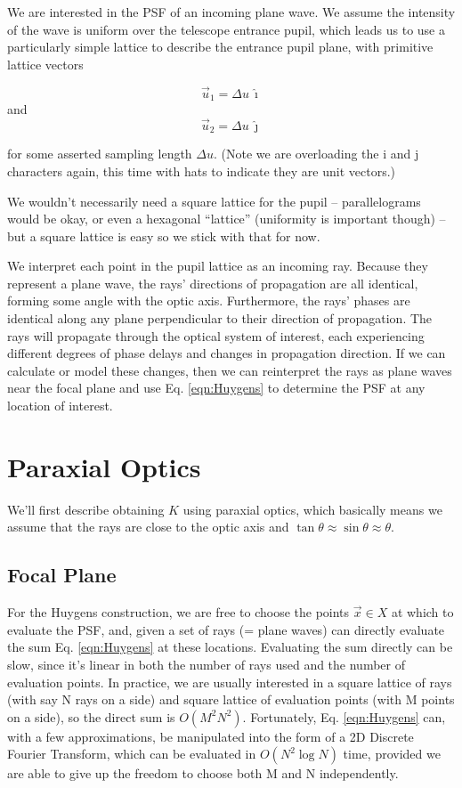\documentclass{article}
\begin{document}
We are interested in the PSF of an incoming plane wave.  We assume the intensity of the wave is
uniform over the telescope entrance pupil, which leads us to use a particularly simple lattice to
describe the entrance pupil plane, with primitive lattice vectors

\begin{equation}
    \vec{u}_1 = \Delta u \, \hat{\imath}
\end{equation}
and
\begin{equation}
    \vec{u}_2 = \Delta u \, \hat{\jmath}
\end{equation}

for some asserted sampling length $\Delta u$. (Note we are overloading the i and j characters again,
this time with hats to indicate they are unit vectors.)

We wouldn't necessarily need a square lattice for the pupil -- parallelograms would be okay, or even
a hexagonal ``lattice'' (uniformity is important though) --  but a square lattice is easy so we
stick with that for now.

We interpret each point in the pupil lattice as an incoming ray.  Because they represent a plane
wave, the rays' directions of propagation are all identical, forming some angle with the optic axis.
Furthermore, the rays' phases are identical along any plane perpendicular to their direction of
propagation.  The rays will propagate through the optical system of interest, each experiencing
different degrees of phase delays and changes in propagation direction.  If we can calculate or
model these changes, then we can reinterpret the rays as plane waves near the focal plane and use
Eq. \ref{eqn:Huygens} to determine the PSF at any location of interest.

\section{Paraxial Optics}

We'll first describe obtaining $K$ using paraxial optics, which basically means we assume that the
rays are close to the optic axis and $\tan \theta \approx \sin \theta \approx \theta$.

\subsection{Focal Plane}

For the Huygens construction, we are free to choose the points $\vec{x} \in X$ at which to evaluate
the PSF, and, given a set of rays (= plane waves) can directly evaluate the sum Eq.
\ref{eqn:Huygens} at these locations.  Evaluating the sum directly can be slow, since it's linear in
both the number of rays used and the number of evaluation points.  In practice, we are usually
interested in a square lattice of rays (with say N rays on a side) and square lattice of evaluation
points (with M points on a side), so the direct sum is $O(M^2 N^2)$.  Fortunately, Eq.
\ref{eqn:Huygens} can, with a few approximations, be manipulated into the form of a 2D Discrete
Fourier Transform, which can be evaluated in $O(N^2 \log N)$ time, provided we are able to give up
the freedom to choose both M and N independently.
\end{document}
